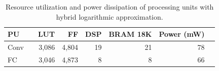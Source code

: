 \begin{table}[!h]\centering
	\caption{Resource utilization and power dissipation of processing units with hybrid logarithmic approximation.}\label{tab:resource_log}
	\scriptsize
\begin{tabular}{lrrrrrrr}\toprule
	\textbf{PU} & &\textbf{LUT} &\textbf{FF} &\textbf{DSP} &\textbf{BRAM 18K} &\textbf{Power (mW)} \\\midrule
	Conv & &3,086 &4,804 &19 &21 &78 \\
	FC & &3,046 &4,873 &8 &8 &66 \\
	\bottomrule
\end{tabular}
\end{table}




